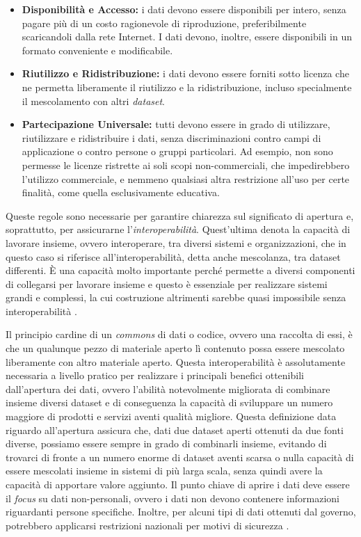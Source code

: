 \begin{itemize}
    \item \textbf{Disponibilità e Accesso:} i dati devono essere disponibili per intero, senza pagare più di un costo ragionevole di riproduzione, preferibilmente scaricandoli dalla rete Internet. I dati devono, inoltre, essere disponibili in un formato conveniente e modificabile.
    \item \textbf{Riutilizzo e Ridistribuzione:} i dati devono essere forniti sotto licenza che ne permetta liberamente il riutilizzo e la ridistribuzione, incluso specialmente il mescolamento con altri \textit{dataset}.
    \item \textbf{Partecipazione Universale:} tutti devono essere in grado di utilizzare, riutilizzare e ridistribuire i dati, senza discriminazioni contro campi di applicazione o contro persone o gruppi particolari. Ad esempio, non sono permesse le licenze ristrette ai soli scopi non-commerciali, che impedirebbero l'utilizzo commerciale, e nemmeno qualsiasi altra restrizione all'uso per certe finalità, come quella esclusivamente educativa.
\end{itemize}

Queste regole sono necessarie per garantire chiarezza sul significato di apertura e, soprattutto, per assicurarne l'\textit{interoperabilità}. Quest'ultima denota la capacità di lavorare insieme, ovvero interoperare, tra diversi sistemi e organizzazioni, che in questo caso si riferisce all'interoperabilità, detta anche mescolanza, tra dataset differenti. \`E una capacità molto importante perché permette a diversi componenti di collegarsi per lavorare insieme e questo è essenziale per realizzare sistemi grandi e complessi, la cui costruzione altrimenti sarebbe quasi impossibile senza interoperabilità \cite{OpenDefinition_Full}.

Il principio cardine di un \textit{commons} di dati o codice, ovvero una raccolta di essi, è che un qualunque pezzo di materiale aperto lì contenuto possa essere mescolato liberamente con altro materiale aperto. Questa interoperabilità è assolutamente necessaria a livello pratico per realizzare i principali benefici ottenibili dall'apertura dei dati, ovvero l'abilità notevolmente migliorata di combinare insieme diversi dataset e di conseguenza la capacità di sviluppare un numero maggiore di prodotti e servizi aventi qualità migliore. Questa definizione data riguardo all'apertura assicura che, dati due dataset aperti ottenuti da due fonti diverse, possiamo essere sempre in grado di combinarli insieme, evitando di trovarci di fronte a un numero enorme di dataset aventi scarsa o nulla capacità di essere mescolati insieme in sistemi di più larga scala, senza quindi avere la capacità di apportare valore aggiunto. Il punto chiave di aprire i dati deve essere il \textit{focus} su dati non-personali, ovvero i dati non devono contenere informazioni riguardanti persone specifiche. Inoltre, per alcuni tipi di dati ottenuti dal governo, potrebbero applicarsi restrizioni nazionali per motivi di sicurezza \cite{OpenDataHandbook_WhyOpenData}.

